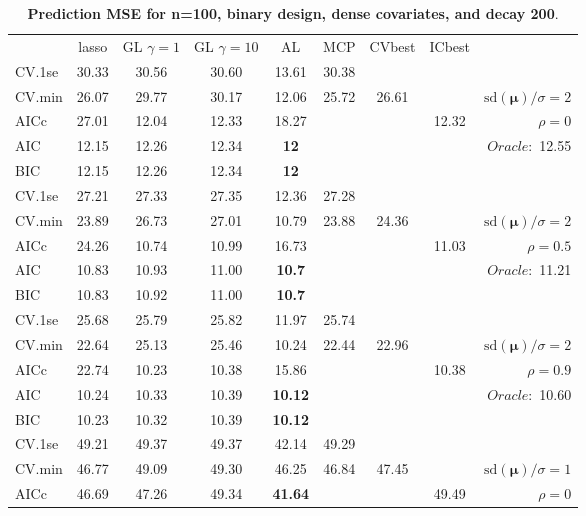 \clearpage
\begin{table}\vspace{-.5cm}
\caption[l]{ { \bf Prediction MSE for n=100, binary design, 
dense covariates, and  decay  200}.}
\vspace{-.5cm}
\footnotesize{}
\begin{center}
\begin{tabular}{l*{7}{c}|r}
 & lasso & GL $\gamma=1$ & GL $\gamma=10$ & AL & MCP  & CVbest & ICbest  \\
\cline{1-9}
CV.1se & 30.33 & 30.56 & 30.60 & 13.61 & 30.38 & & & \\
CV.min & 26.07 & 29.77 & 30.17 & 12.06 & 25.72 & 26.61 & & $\mathrm{sd}(\mathbf{\mu})/\sigma=2$ \\
AICc & 27.01 & 12.04 & 12.33 & 18.27 & & & 12.32 &  $\rho=0$ \\
AIC & 12.15 & 12.26 & 12.34 & {\bf 12} & & & &  \multirow{2}{*}{$Oracle: $ 12.55} \\
BIC & 12.15 & 12.26 & 12.34 & {\bf 12} & & & &  \\
 \hline 
CV.1se & 27.21 & 27.33 & 27.35 & 12.36 & 27.28 & & & \\
CV.min & 23.89 & 26.73 & 27.01 & 10.79 & 23.88 & 24.36 & & $\mathrm{sd}(\mathbf{\mu})/\sigma=2$ \\
AICc & 24.26 & 10.74 & 10.99 & 16.73 & & & 11.03 &  $\rho=0.5$ \\
AIC & 10.83 & 10.93 & 11.00 & {\bf 10.7} & & & &  \multirow{2}{*}{$Oracle: $ 11.21} \\
BIC & 10.83 & 10.92 & 11.00 & {\bf 10.7} & & & &  \\
 \hline 
CV.1se & 25.68 & 25.79 & 25.82 & 11.97 & 25.74 & & & \\
CV.min & 22.64 & 25.13 & 25.46 & 10.24 & 22.44 & 22.96 & & $\mathrm{sd}(\mathbf{\mu})/\sigma=2$ \\
AICc & 22.74 & 10.23 & 10.38 & 15.86 & & & 10.38 &  $\rho=0.9$ \\
AIC & 10.24 & 10.33 & 10.39 & {\bf 10.12} & & & &  \multirow{2}{*}{$Oracle: $ 10.60} \\
BIC & 10.23 & 10.32 & 10.39 & {\bf 10.12} & & & &  \\
 \hline 
CV.1se & 49.21 & 49.37 & 49.37 & 42.14 & 49.29 & & & \\
CV.min & 46.77 & 49.09 & 49.30 & 46.25 & 46.84 & 47.45 & & $\mathrm{sd}(\mathbf{\mu})/\sigma=1$ \\
AICc & 46.69 & 47.26 & 49.34 & {\bf 41.64} & & & 49.49 &  $\rho=0$ \\

\end{tabular}
\end{center}
\end{table}
